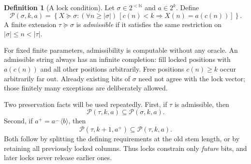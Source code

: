 \documentclass[11pt,a4paper]{article}
\newcommand{\N}{\mathbb N}
\newcommand{\Pcond}{\mathcal P}
\theoremstyle{definition}\newtheorem{definition}[theorem]{Definition}
\theoremstyle{remark}\newtheorem{remark}[theorem]{Remark}
\begin{document}
\begin{definition}[A lock condition]\label{def:lock}
Let $\sigma\in2^{<\N}$ and $a\in2^k$. Define
\[
 \Pcond(\sigma,k,a)=
 \left\{X\succeq\sigma:
  (\forall n\geq|\sigma|)\,[c(n)<k\Rightarrow X(n)=a(c(n))]\right\}.
\]
A finite extension $\tau\succeq\sigma$ is \emph{admissible} if it satisfies the same restriction on $|\sigma|\leq n<|\tau|$.
\end{definition}

For fixed finite parameters, admissibility is computable without any oracle. An admissible string always has an infinite completion: fill locked positions with $a(c(n))$ and all other positions arbitrarily. Free positions $c(n)\geq k$ occur arbitrarily far out. Already existing bits of $\sigma$ need not agree with the lock vector; those finitely many exceptions are deliberately allowed.

Two preservation facts will be used repeatedly. First, if $\tau$ is admissible, then
\begin{equation}\label{eq:refine}
 \Pcond(\tau,k,a)\subseteq\Pcond(\sigma,k,a).
\end{equation}
Second, if $a^+=a\mathbin{{}^\frown}\langle b\rangle$, then
\begin{equation}\label{eq:addlock}
 \Pcond(\tau,k+1,a^+)\subseteq\Pcond(\tau,k,a).
\end{equation}
Both follow by splitting the defining requirements at the old stem length, or by retaining all previously locked columns. Thus locks constrain only \emph{future} bits, and later locks never release earlier ones.
\end{document}
